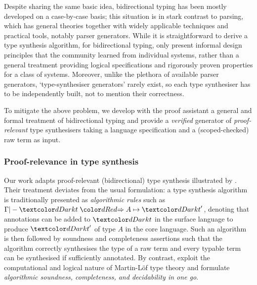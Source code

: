 
Despite sharing the same basic idea, bidirectional typing has been mostly developed on a case-by-case basis; this situation is in stark contrast to parsing, which has general theories together with widely applicable techniques and practical tools, notably parser generators.
While it is straightforward to derive a type synthesis algorithm,
for bidirectional typing, \citeauthor{Dunfield2021} only present informal design principles that the community learned from individual systems, rather than a general treatment providing logical specifications and rigorously proven properties for a class of systems.
Moreover, unlike the plethora of available parser generators, `type-synthesiser generators' rarely exist, so each type synthesiser has to be independently built, not to mention their correctness.

To mitigate the above problem, we develop with the proof assistant \Agda a general and formal treatment of bidirectional typing and provide a \emph{verified} generator of \emph{proof-relevant} type synthesisers taking a language specification and a (scoped-checked) raw term as input.

\subsubsection{Proof-relevance in type synthesis}
\label{sec:PLFA}

Our work adapts proof-relevant (bidirectional) type synthesis illustrated by \citet{Wadler2022}.
Their treatment deviates from the usual formulation: 
a type synthesis algorithm is traditionally presented as \emph{algorithmic rules} such as $\Gamma |- \isTerm{t} \syn A \mapsto \isTerm{t}'$, denoting that annotations can be added to $\isTerm{t}$ in the surface language to produce $\isTerm{t}'$ of type $A$ in the core language.
Such an algorithm is then followed by soundness and completeness assertions such that the algorithm correctly synthesises the type of a raw term and every typable term can be synthesised if sufficiently annotated.
By contrast, \citeauthor{Wadler2022} exploit the computational and logical nature of Martin-L\"of type theory and formulate \emph{algorithmic soundness, completeness, and decidability in one go}.

